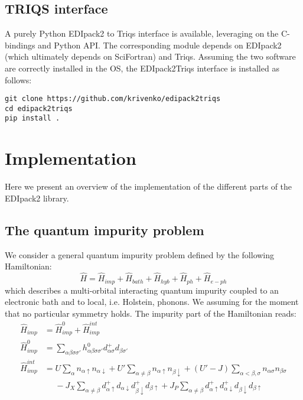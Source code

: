 \documentclass[final,3p,10pt]{elsarticle}
\def\a{\alpha}       \def\b{\beta}   \def\g{\gamma}   \def\d{\delta}
\def\NAME{{\rm EDIpack2 }}
\begin{document}
\subsection{TRIQS interface}
A purely Python \NAME to Triqs interface is available, leveraging on
the C-bindings and Python API. The corresponding module depends on
\NAME (which ultimately depends on SciFortran) and Triqs.
Assuming the two software are correctly installed in the OS, the
EDIpack2Triqs interface is installed as follows:

\begin{lstlisting}[style=mybash]
git clone https://github.com/krivenko/edipack2triqs
cd edipack2triqs
pip install .
\end{lstlisting}










\section{Implementation}\label{SecEDIpack}
Here we present an overview of the implementation of the
different parts of the \NAME library. 

\subsection{The quantum impurity problem}\label{sSecQIM}
We consider a general quantum impurity problem defined by the
following Hamiltonian:
$$
\hat{H} = \hat{H}_{imp} + \hat{H}_{bath} + \hat{H}_{hyb} + \hat{H}_{ph} + \hat{H}_{e-ph}
$$
which describes a  multi-orbital interacting quantum
impurity coupled to an electronic bath and to local, i.e. Holstein,
phonons. We assuming for the moment that no particular symmetry
holds. The impurity part of the Hamiltonian reads: 
\begin{equation}\label{Himp}
  \begin{split}
    \hat{H}_{imp} & = \hat{H}^0_{imp} + \hat{H}^{int}_{imp}\\
    \hat{H}^0_{imp} & =
    \sum_{\a\b\sigma\sigma'}h^{0}_{\a\b\sigma\sigma'}d^{+}_{\a\sigma}d_{\b\sigma'}\\
    \hat{H}^{int}_{imp} &=U\sum_{\a}n_{\a\uparrow}n_{\a\downarrow}+U'\sum_{\a\neq \b}n_{\a\uparrow}n_{\b\downarrow}+(U'-J)\sum_{\a<\b,\sigma}n_{\a\sigma}n_{\b\sigma}\\
    &{\phantom =}- J_X\sum_{\a\neq
      \b}d^{+}_{\a\uparrow}d_{\a\downarrow}d^{+}_{\b\downarrow}d_{\b\uparrow}+J_P\sum_{\a
      \neq
      \b}d^{+}_{\a\uparrow}d^{+}_{\a\downarrow}d_{\b\downarrow}d_{\b\uparrow}\\
\end{split}
\end{equation}
\end{document}
